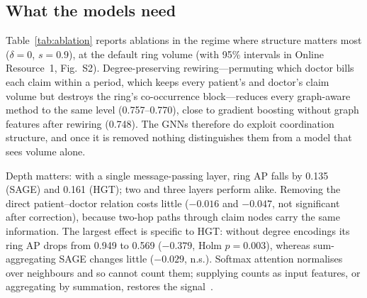 \documentclass[pdflatex,sn-vancouver-num]{sn-jnl}
\newcommand{\SFigAblation}{S2}\newcommand{\SFigProtocol}{S3}
\begin{document}
\subsection{What the models need}\label{sec:needs}
Table~\ref{tab:ablation} reports ablations in the regime where structure
matters most ($\delta=0$, $s=0.9$), at the default ring volume (with 95\%
intervals in Online Resource~1, Fig.~\SFigAblation).
Degree-preserving rewiring---permuting which doctor bills each claim within a
period, which keeps every patient's and doctor's claim volume but destroys
the ring's co-occurrence block---reduces every graph-aware method to the same
level (0.757--0.770), close to gradient boosting without graph features after
rewiring (0.748). The GNNs therefore do exploit coordination structure, and
once it is removed nothing distinguishes them from a model that sees volume
alone.

Depth matters: with a single message-passing layer, ring AP falls by 0.135
(SAGE) and 0.161 (HGT); two and three layers perform alike. Removing the
direct patient--doctor relation costs little ($-0.016$ and $-0.047$, not
significant after correction), because two-hop paths through claim nodes
carry the same information. The largest effect is specific to HGT: without
degree encodings its ring AP drops from 0.949 to 0.569 ($-0.379$, Holm
$p=0.003$), whereas sum-aggregating SAGE changes little ($-0.029$, n.s.).
Softmax attention normalises over neighbours and so cannot count them;
supplying counts as input features, or aggregating by summation, restores
the signal~\cite{xu2019gin}.
\end{document}

